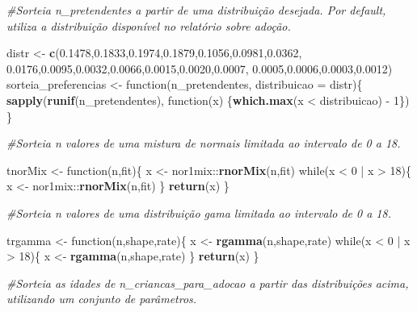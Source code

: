 \documentclass[]{book}
\newenvironment{Shaded}{\begin{snugshade}}{\end{snugshade}}
\newcommand{\KeywordTok}[1]{\textcolor[rgb]{0.13,0.29,0.53}{\textbf{{#1}}}}
\newcommand{\DataTypeTok}[1]{\textcolor[rgb]{0.13,0.29,0.53}{{#1}}}
\newcommand{\DecValTok}[1]{\textcolor[rgb]{0.00,0.00,0.81}{{#1}}}
\newcommand{\FloatTok}[1]{\textcolor[rgb]{0.00,0.00,0.81}{{#1}}}
\newcommand{\StringTok}[1]{\textcolor[rgb]{0.31,0.60,0.02}{{#1}}}
\newcommand{\CommentTok}[1]{\textcolor[rgb]{0.56,0.35,0.01}{\textit{{#1}}}}
\newcommand{\NormalTok}[1]{{#1}}
\begin{document}
\begin{Shaded}
\begin{Highlighting}[]
\CommentTok{#Sorteia n_pretendentes a partir de uma distribuição desejada. Por default, utiliza a distribuição disponível no relatório sobre adoção.}

\NormalTok{distr <-}\StringTok{ }\KeywordTok{c}\NormalTok{(}\FloatTok{0.1478}\NormalTok{,}\FloatTok{0.1833}\NormalTok{,}\FloatTok{0.1974}\NormalTok{,}\FloatTok{0.1879}\NormalTok{,}\FloatTok{0.1056}\NormalTok{,}\FloatTok{0.0981}\NormalTok{,}\FloatTok{0.0362}\NormalTok{,}
           \FloatTok{0.0176}\NormalTok{,}\FloatTok{0.0095}\NormalTok{,}\FloatTok{0.0032}\NormalTok{,}\FloatTok{0.0066}\NormalTok{,}\FloatTok{0.0015}\NormalTok{,}\FloatTok{0.0020}\NormalTok{,}\FloatTok{0.0007}\NormalTok{,}
           \FloatTok{0.0005}\NormalTok{,}\FloatTok{0.0006}\NormalTok{,}\FloatTok{0.0003}\NormalTok{,}\FloatTok{0.0012}\NormalTok{)}
\NormalTok{sorteia_preferencias <-}\StringTok{ }\NormalTok{function(n_pretendentes, }\DataTypeTok{distribuicao =} \NormalTok{distr)\{}
  \KeywordTok{sapply}\NormalTok{(}\KeywordTok{runif}\NormalTok{(n_pretendentes), function(x) \{}\KeywordTok{which.max}\NormalTok{(x <}\StringTok{ }\NormalTok{distribuicao) -}\StringTok{ }\DecValTok{1}\NormalTok{\})}
\NormalTok{\}}

\CommentTok{#Sorteia n valores de uma mistura de normais limitada ao intervalo de 0 a 18.}

\NormalTok{tnorMix <-}\StringTok{ }\NormalTok{function(n,fit)\{}
  \NormalTok{x <-}\StringTok{ }\NormalTok{nor1mix::}\KeywordTok{rnorMix}\NormalTok{(n,fit)}
  \NormalTok{while(x <}\StringTok{ }\DecValTok{0} \NormalTok{|}\StringTok{ }\NormalTok{x >}\StringTok{ }\DecValTok{18}\NormalTok{)\{}
    \NormalTok{x <-}\StringTok{ }\NormalTok{nor1mix::}\KeywordTok{rnorMix}\NormalTok{(n,fit)}
  \NormalTok{\}}
  \KeywordTok{return}\NormalTok{(x)}
\NormalTok{\}}

\CommentTok{#Sorteia n valores de uma distribuição gama limitada ao intervalo de 0 a 18.}

\NormalTok{trgamma <-}\StringTok{ }\NormalTok{function(n,shape,rate)\{}
  \NormalTok{x <-}\StringTok{ }\KeywordTok{rgamma}\NormalTok{(n,shape,rate)}
  \NormalTok{while(x <}\StringTok{ }\DecValTok{0} \NormalTok{|}\StringTok{ }\NormalTok{x >}\StringTok{ }\DecValTok{18}\NormalTok{)\{}
    \NormalTok{x <-}\StringTok{ }\KeywordTok{rgamma}\NormalTok{(n,shape,rate)}
  \NormalTok{\}}
  \KeywordTok{return}\NormalTok{(x)}
\NormalTok{\}}

\CommentTok{#Sorteia as idades de n_criancas_para_adocao a partir das distribuições acima, utilizando um conjunto de parâmetros.}


\end{Highlighting}
\end{Shaded}
\end{document}
